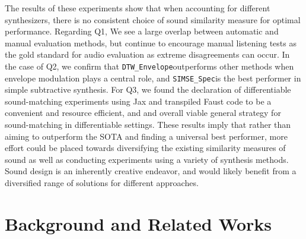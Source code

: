 \documentclass[lettersize,journal]{IEEEtran}
\newcommand{\SIMSESpec}{\texttt{SIMSE\_Spec}}
\newcommand{\DTWEnv}{\texttt{DTW\_Envelope}}
\begin{document}
The results of these experiments show that when accounting for different synthesizers, there is no consistent choice of sound similarity measure for optimal performance. Regarding Q1, We see a large overlap between automatic and manual evaluation methods, but continue to encourage manual listening tests as the gold standard for audio evaluation as extreme disagreements can occur. In the case of Q2, we confirm that \DTWEnv outperforms other methods when envelope modulation plays a central role, and \SIMSESpec is the best performer in simple subtractive synthesis. For Q3, we found the declaration of differentiable sound-matching experiments using Jax and transpiled Faust code to be a convenient and resource efficient, and and overall viable general strategy for sound-matching in differentiable settings. These results imply that rather than aiming to outperform the SOTA and finding a universal best performer, more effort could be placed towards diversifying the existing similarity measures of sound as well as conducting experiments using a variety of synthesis methods. Sound design is an inherently creative endeavor, and would likely benefit from a diversified range of solutions for different approaches.






\section{Background and Related Works}
\end{document}
